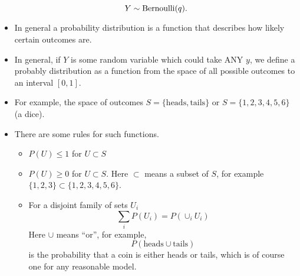\begin{itemize}
\begin{equation}
Y \sim {\rm Bernoulli}(q).
\end{equation}
\item In general a probability distribution is a function that describes how likely certain outcomes are. 
\item In general, if $Y$ is some random variable which could take ANY $y$, we define a probably distribution as a function from the space of all possible outcomes to an interval $[0,1]$. 
\item For example,  the space of outcomes $S = \{\text{heads},\text{tails}\}$ or $S = \{1,2,3,4,5,6\}$ (a dice).  
\item There are some rules for such functions. 
\begin{itemize}
\item $P(U) \le 1$  for $U \subset S$
\item $P(U) \ge 0$ for $U \subset S$. Here $\subset$ means a subset of $S$, for example $\{1,2,3\} \subset \{1,2,3,4,5,6\}$. 
\item For a disjoint family of sets $U_i$
\begin{equation*}
 \sum_{i}P(U_i) = P\left(\cup_i U_i\right)
\end{equation*}
Here $\cup$ means ``or'', for example, 
\begin{equation*}
 P\left(\text{heads} \cup \text{tails} \right) 
 \end{equation*}
 is the probability that a coin is either heads or tails, which is of course one for any reasonable model. 
\end{itemize}




\end{itemize}
